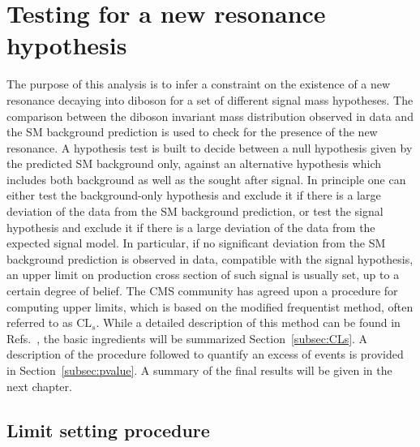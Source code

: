 \section{Testing for a new resonance hypothesis}\label{sec:stat}

The purpose of this analysis is to infer a constraint on the existence of a new resonance decaying into diboson for a set of different signal mass hypotheses.
The comparison between the diboson invariant mass distribution observed in data and the SM background prediction is used to check for the presence of the new resonance.
A hypothesis test is built to decide between a null hypothesis given by the predicted SM background only, against an alternative hypothesis which includes both background as well as the sought after signal.
In principle one can either test the background-only hypothesis and exclude it if there is a large deviation of the data from the SM background prediction,
or test the signal hypothesis and exclude it if there is a large deviation of the data from the expected signal model.
In particular, if no significant deviation from the SM background prediction is observed in data, compatible with the signal hypothesis, an upper limit on 
production cross section of such signal is usually set, up to a certain degree of belief.
The CMS community has agreed upon a procedure for computing upper limits, which is based on the modified frequentist method, often referred to as $\mathrm{CL}_s$.
While a detailed description of this method can be found in Refs.~\cite{CLs1,Junk:1999kv}, the basic ingredients will be summarized Section~\ref{subsec:CLs}.
A description of the procedure followed to quantify an excess of events is provided in Section~\ref{subsec:pvalue}. A summary of the final results will be given in the next chapter.

\subsection{Limit setting procedure}~\label{subsec:CLs}

